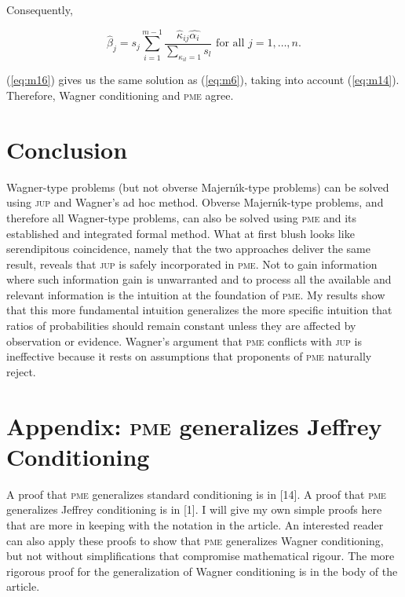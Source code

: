 \documentclass[entropy,article,submit,oneauthor,pdftex,12pt,a4paper]{mdpi}
\begin{document}
{\noindent}Consequently,

\begin{equation}
  \label{eq:m16}
  \hat{\beta}_{j}=s_{j}\sum_{i=1}^{m-1}\frac{\hat{\kappa}_{ij}\hat{\alpha_{i}}}{\sum_{\kappa_{il}=1}s_{l}}\mbox{ for all }j=1,\ldots,n.
\end{equation}

{\noindent}(\ref{eq:m16}) gives us the same solution as (\ref{eq:m6}),
taking into account (\ref{eq:m14}). Therefore, Wagner conditioning and
\textsc{pme} agree.

\section{Conclusion}
\label{Conclusion}

Wagner-type problems (but not obverse Majern{\'\i}k-type problems) can
be solved using \textsc{jup} and Wagner's ad hoc method. Obverse
Majern{\'\i}k-type problems, and therefore all Wagner-type problems,
can also be solved using \textsc{pme} and its established and
integrated formal method. What at first blush looks like serendipitous
coincidence, namely that the two approaches deliver the same result,
reveals that \textsc{jup} is safely incorporated in \textsc{pme}. Not
to gain information where such information gain is unwarranted and to
process all the available and relevant information is the intuition at
the foundation of \textsc{pme}. My results show that this more
fundamental intuition generalizes the more specific intuition that
ratios of probabilities should remain constant unless they are
affected by observation or evidence. Wagner's argument that
\textsc{pme} conflicts with \textsc{jup} is ineffective because it
rests on assumptions that proponents of \textsc{pme} naturally reject.

\appendix

\section{Appendix: \textsc{pme} generalizes Jeffrey Conditioning}
\label{appendix}

A proof that \textsc{pme} generalizes standard conditioning is in
[14]. A proof that \textsc{pme} generalizes Jeffrey conditioning is in
[1]. I will give my own simple proofs here that are more in keeping
with the notation in the article. An interested reader can also apply
these proofs to show that \textsc{pme} generalizes Wagner
conditioning, but not without simplifications that compromise
mathematical rigour. The more rigorous proof for the generalization of
Wagner conditioning is in the body of the article.
\end{document}
